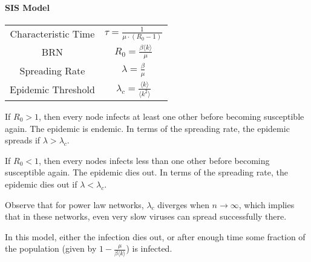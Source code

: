 \documentclass[english]{panikzettel}
\begin{document}
\begin{halfboxl}
    \paragraph{SIS Model}
    \begin{center}

        \begin{tabular}{c|c}
            Characteristic Time & $\tau = \frac{1}{\mu \cdot (R_0 - 1)}$ \\
            BRN & $R_0 = \frac{\beta \langle k \rangle}{\mu}$ \\
            Spreading Rate & $\lambda = \frac{\beta}{\mu}$ \\
            Epidemic Threshold & $\lambda_c = \frac{\langle k \rangle}{\langle k^2 \rangle}$ \\
        \end{tabular}
    \end{center}
    If $R_0 > 1$, then every node infects at least one other before becoming susceptible again.
    The epidemic is endemic.
    In terms of the spreading rate, the epidemic spreads if $\lambda > \lambda_c$.

    If $R_0 < 1$, then every nodes infects less than one other before becoming susceptible again. The epidemic dies out.
    In terms of the spreading rate, the epidemic dies out if $\lambda < \lambda_c$.

    Observe that for power law networks, $\lambda_c$ diverges when $n \to \infty$, which implies that in these networks, even very slow viruses can spread successfully there.

    In this model, either the infection dies out, or after enough time some fraction of the population (given by $1-\frac{\mu}{\beta \langle k \rangle}$) is infected.
\end{halfboxl}%
\end{document}
